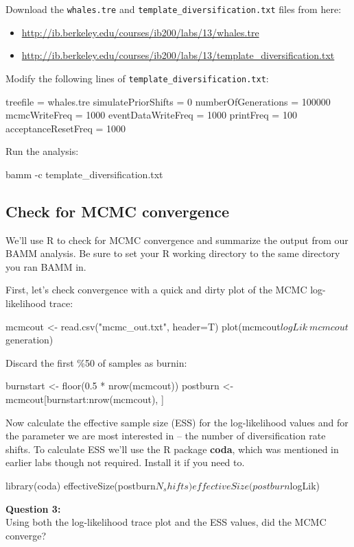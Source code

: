 \documentclass[11pt]{article}
\begin{document}
Download the \texttt{whales.tre} and \texttt{template\_diversification.txt}
files from here:
\begin{itemize}
\item \url{http://ib.berkeley.edu/courses/ib200/labs/13/whales.tre}
\item \url{http://ib.berkeley.edu/courses/ib200/labs/13/template\_diversification.txt}
\end{itemize}
Modify the following lines of
\texttt{template\_diversification.txt}:
\begin{code}
treefile = whales.tre
simulatePriorShifts = 0
numberOfGenerations = 100000
mcmcWriteFreq = 1000
eventDataWriteFreq = 1000
printFreq = 100
acceptanceResetFreq = 1000
\end{code}
Run the analysis:
\begin{code}
bamm -c template_diversification.txt
\end{code}

\subsection{Check for MCMC convergence}

We'll use R to check for MCMC convergence and summarize
the output from our BAMM analysis.
Be sure to set your R working directory to the
same directory you ran BAMM in.

First, let's check 
convergence with a quick and dirty plot of
the MCMC log-likelihood trace:
\begin{code}
mcmcout <- read.csv("mcmc_out.txt", header=T)
plot(mcmcout$logLik ~ mcmcout$generation)
\end{code}
Discard the first \%50 of samples as burnin:
\begin{code}
burnstart <- floor(0.5 * nrow(mcmcout))
postburn <- mcmcout[burnstart:nrow(mcmcout), ]
\end{code}
Now calculate the effective sample size (ESS)
for the log-likelihood values
    and for the parameter we are most interested
    in -- the number of diversification rate shifts.
    To calculate ESS we'll use the R package \textbf{coda}, 
    which was mentioned in earlier labs though not required.
    Install it if you need to.
\begin{code}
library(coda)
effectiveSize(postburn$N_shifts)
effectiveSize(postburn$logLik)
\end{code}

\begin{framed}
\noindent
\textbf{Question 3:} \\
Using both the log-likelihood trace plot
and the ESS values, did the MCMC converge?
\end{framed}
\end{document}
